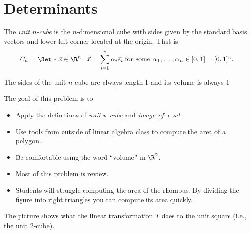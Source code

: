 \documentclass{problemset}
\begin{document}
\section*{Determinants}
	\begin{definition}
		The \emph{unit $n$-cube} is the $n$-dimensional cube with sides given by the standard
		basis vectors and lower-left
		corner located at the origin.  That is
		\[
			C_n=\Set*{\vec x\in\R^n:\vec x=\sum_{i=1}^n\alpha_i\vec e_i\text{ for some }\alpha_1,\ldots,\alpha_n\in[0,1]}=[0,1]^n.
		\]
	\end{definition}
	The sides of the unit $n$-cube are always length 1 and its volume is always 1.

	\question
	\begin{annotation}
		\begin{goals}

			The goal of this problem is to
			\begin{itemize}
				\item Apply the definitions of \emph{unit $n$-cube} and \emph{image of a set}.
				\item Use tools from outside of linear algebra class to compute the area of a polygon.
				\item Be comfortable using the word ``volume'' in $\R^2$.
			\end{itemize}
		\end{goals}

		\begin{notes}
			\begin{itemize}
				\item Most of this problem is review.
				\item Students will struggle computing the area of the rhombus. By dividing
					the figure into right triangles you can compute its area quickly.
			\end{itemize}
		\end{notes}
	\end{annotation}
	The picture shows what the linear transformation $T$ does to the unit square (i.e., the unit $2$-cube).
\end{document}

